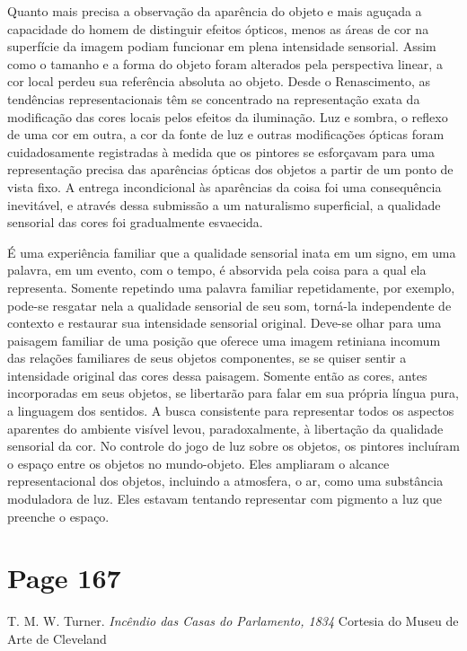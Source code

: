 \documentclass[a4paper]{article}
\begin{document}
Quanto mais precisa a observação da aparência do objeto e mais aguçada a capacidade do homem de distinguir efeitos ópticos, menos as áreas de cor na superfície da imagem podiam funcionar em plena intensidade sensorial. Assim como o tamanho e a forma do objeto foram alterados pela perspectiva linear, a cor local perdeu sua referência absoluta ao objeto. Desde o Renascimento, as tendências representacionais têm se concentrado na representação exata da modificação das cores locais pelos efeitos da iluminação. Luz e sombra, o reflexo de uma cor em outra, a cor da fonte de luz e outras modificações ópticas foram cuidadosamente registradas à medida que os pintores se esforçavam para uma representação precisa das aparências ópticas dos objetos a partir de um ponto de vista fixo. A entrega incondicional às aparências da coisa foi uma consequência inevitável, e através dessa submissão a um naturalismo superficial, a qualidade sensorial das cores foi gradualmente esvaecida.

É uma experiência familiar que a qualidade sensorial inata em um signo, em uma palavra, em um evento, com o tempo, é absorvida pela coisa para a qual ela representa. Somente repetindo uma palavra familiar repetidamente, por exemplo, pode-se resgatar nela a qualidade sensorial de seu som, torná-la independente de contexto e restaurar sua intensidade sensorial original. Deve-se olhar para uma paisagem familiar de uma posição que oferece uma imagem retiniana incomum das relações familiares de seus objetos componentes, se se quiser sentir a intensidade original das cores dessa paisagem. Somente então as cores, antes incorporadas em seus objetos, se libertarão para falar em sua própria língua pura, a linguagem dos sentidos. A busca consistente para representar todos os aspectos aparentes do ambiente visível levou, paradoxalmente, à libertação da qualidade sensorial da cor. No controle do jogo de luz sobre os objetos, os pintores incluíram o espaço entre os objetos no mundo-objeto. Eles ampliaram o alcance representacional dos objetos, incluindo a atmosfera, o ar, como uma substância moduladora de luz. Eles estavam tentando representar com pigmento a luz que preenche o espaço.

\vspace*{\fill}

\newpage
\section*{Page 167}

T. M. W. Turner. \emph{Incêndio das Casas do Parlamento, 1834}
Cortesia do Museu de Arte de Cleveland
\end{document}
